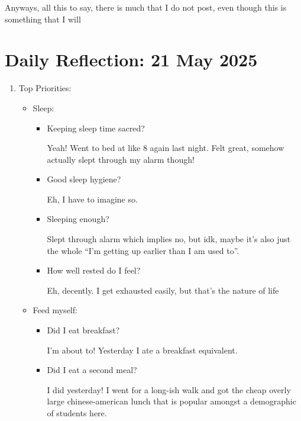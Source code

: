 \documentclass[12pt]{article}
\newcommand{\say}[1]{``#1''}
\renewcommand{\,}{\textsuperscript{,}}
\begin{document}
Anyways, all this to say, there is much that I do not post, even though this is something that I will

\section{Daily Reflection: 21 May 2025}

\begin{enumerate}

\item Top Priorities:

\begin{itemize}

\item Sleep:

\begin{itemize}

\item Keeping sleep time sacred?

Yeah! Went to bed at like 8 again last night. Felt great, somehow actually slept through my alarm though!

\item Good sleep hygiene?

Eh, I have to imagine so.

\item Sleeping enough?

Slept through alarm which implies no, but idk, maybe it's also just the whole \say{I'm getting up earlier than I am used to}.

\item How well rested do I feel?

Eh, decently. I get exhausted easily, but that's the nature of life

\end{itemize}

\item Feed myself:

\begin{itemize}

\item Did I eat breakfast?

I'm about to! Yesterday I ate a breakfast equivalent.

\item Did I eat a second meal?

I did yesterday! I went for a long-ish walk and got the cheap overly large chinese-american lunch that is popular amongst a demographic of students here.


\end{itemize}
\end{itemize}
\end{enumerate}
\end{document}
